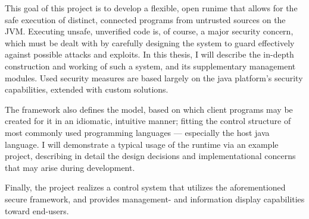 This goal of this project is to develop a flexible, open runime that allows for the safe execution of distinct, connected programs from untrusted sources on the JVM. Executing unsafe, unverified code is, of course, a major security concern, which must be dealt with by carefully designing the system to guard effectively against possible attacks and exploits. In this thesis, I will describe the in-depth construction and working of such a system, and its supplementary management modules. Used security measures are based largely on the java platform's security capabilities, extended with custom solutions.

The framework also defines the model, based on which client programs may be created for it in an idiomatic, intuitive manner; fitting the control structure of most commonly used programming languages --- especially the host java language. I will demonstrate a typical usage of the runtime via an example project, describing in detail the design decisions and implementational concerns that may arise during development.

Finally, the project realizes a control system that utilizes the aforementioned secure framework, and provides management- and information display capabilities toward end-users.


\vfill

%
